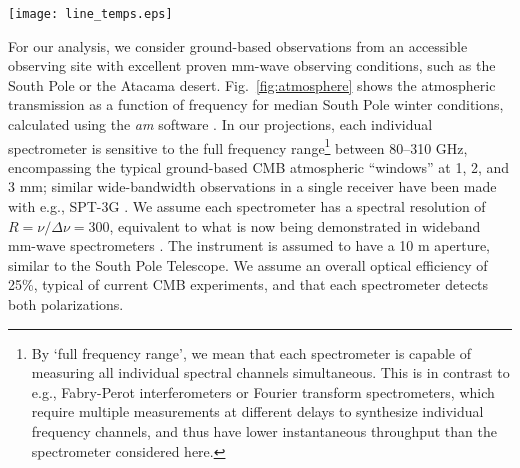 \documentclass[twocolumn]{aastex631}
\begin{document}
\begin{figure*}[t]
\texttt{[image: line\_temps.eps]}
\caption{ Spectral lines detectable by a ground-based survey. Shown above are model predictions for the brightness temperature of individual lines, their sum total (in dashed black), and atmospheric transmission (in light thin blue). The colors correspond to observed redshifts of the lines. The shown signal strengths adopt line luminosities scaled from the IR luminosity based on observational relations. Current constraints on these line ratios are uncertain by up to one order of magnitude.}
\label{fig:atmosphere}\vspace{.2in}
\end{figure*}
For our analysis, we consider ground-based observations from an accessible observing site with excellent proven mm-wave observing conditions, such as the South Pole or the Atacama desert. Fig.~\ref{fig:atmosphere} shows the atmospheric transmission as a function of frequency for median South Pole winter conditions, calculated using the \textit{am} software \citep{paine2019}. In our projections, each individual spectrometer is sensitive to the full frequency range\footnote{By `full frequency range', we mean that each spectrometer is capable of measuring all individual spectral channels simultaneous. This is in contrast to e.g., Fabry-Perot interferometers or Fourier transform spectrometers, which require multiple measurements at different delays to synthesize individual frequency channels, and thus have lower instantaneous throughput than the spectrometer considered here.} between 80--310 GHz, encompassing the typical ground-based CMB atmospheric ``windows'' at 1, 2, and 3 mm; similar wide-bandwidth observations in a single receiver have been made with e.g., SPT-3G \citep{Anderson:2019dhb}. We assume each spectrometer has a spectral resolution of $R= \nu/\Delta \nu = 300$, equivalent to what is now being demonstrated in wideband mm-wave spectrometers \citep{redford2018, karkare2020}. The instrument is assumed to have a 10 m aperture, similar to the South Pole Telescope.  We assume an overall optical efficiency of 25\%, typical of current CMB experiments, and that each spectrometer detects both polarizations.  
\end{document}

